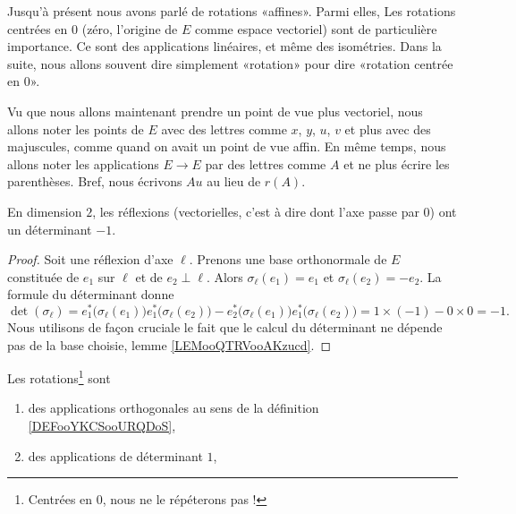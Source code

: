 \begin{normaltext}      \label{NORMooOUDJooRfbDEX}
    Jusqu'à présent nous avons parlé de rotations «affines». Parmi elles, Les rotations centrées en \( 0\) (zéro, l'origine de \( E\) comme espace vectoriel) sont de particulière importance. Ce sont des applications linéaires, et même des isométries. Dans la suite, nous allons souvent dire simplement «rotation» pour dire «rotation centrée en \( 0\)».

    Vu que nous allons maintenant prendre un point de vue plus vectoriel, nous allons noter les points de \( E\) avec des lettres comme \( x\), \( y\), \( u\), \( v\) et plus avec des majuscules, comme quand on avait un point de vue affin. En même temps, nous allons noter les applications \( E\to E \) par des lettres comme \( A\) et ne plus écrire les parenthèses. Bref, nous écrivons \( Au\) au lieu de \( r(A)\).
\end{normaltext}

\begin{lemma}       \label{LEMooSYZYooWDFScw}
    En dimension \( 2\), les réflexions (vectorielles, c'est à dire dont l'axe passe par \( 0\)) ont un déterminant \( -1\).
\end{lemma}

\begin{proof}
    Soit une réflexion d'axe \( \ell\). Prenons une base orthonormale de \( E\) constituée de \( e_1\) sur \( \ell\) et de \( e_2\perp \ell\). Alors \( \sigma_{\ell}(e_1)=e_1\) et \( \sigma_{\ell}(e_2)=-e_2\). La formule du déterminant donne
    \begin{equation}
        \det(\sigma_{\ell})=e_1^*\big( \sigma_{\ell}(e_1) \big)e_1^*\big( \sigma_{\ell}(e_2) \big)-e_2^*\big( \sigma_{\ell}(e_1) \big)e_1^*\big( \sigma_{\ell}(e_2) \big)=1\times (-1)-0\times 0=-1.
    \end{equation}
    Nous utilisons de façon cruciale le fait que le calcul du déterminant ne dépende pas de la base choisie, lemme \ref{LEMooQTRVooAKzucd}.
\end{proof}

\begin{proposition}     \label{PROPooTUJWooAjtEnQ}
    Les rotations\footnote{Centrées en \( 0\), nous ne le répéterons pas !} sont 
    \begin{enumerate}
        \item
            des applications orthogonales au sens de la définition \ref{DEFooYKCSooURQDoS},
        \item
             des applications de déterminant \( 1\),
    \end{enumerate}
\end{proposition}

